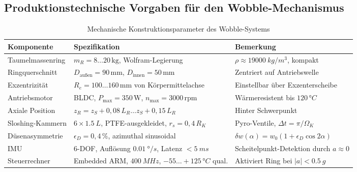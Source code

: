 ﻿\documentclass[12pt,a4paper]{article}
\begin{document}
\subsection{Produktionstechnische Vorgaben für den Wobble-Mechanismus}

\begin{table}
\centering
\caption{Mechanische Konstruktionsparameter des Wobble-Systems}
\label{tab:wobble_params}
\begin{tabular}{lll}
\toprule
\textbf{Komponente} & \textbf{Spezifikation} & \textbf{Bemerkung}\\
\midrule
Taumelmassenring  & $m_R = 8\ldots20\,\mathrm{kg}$, Wolfram-Legierung &
  $\rho \approx \SI{19000}{kg/m^3}$, kompakt\\
Ringquerschnitt   & $D_{\mathrm{außen}} = 90\,\mathrm{mm}$, $D_{\mathrm{innen}}=50\,\mathrm{mm}$ &
  Zentriert auf Antriebswelle\\
Exzentrizität     & $R_e = 100\ldots160\,\mathrm{mm}$ von Körpermittelachse &
  Einstellbar über Exzenterscheibe\\
Antriebsmotor     & BLDC, $P_{\mathrm{max}} = 350\,\mathrm{W}$, $n_{\max}=3000\,\mathrm{rpm}$ &
  Wärmeresistent bis $120\, °C$\\
Axiale Position   & $z_R = z_S + 0{,}08\,L_R\ldots z_S + 0{,}15\,L_R$ &
  Hinter Schwerpunkt\\
Sloshing-Kammern  & $6\times \SI{1.5}{L}$, PTFE-ausgekleidet, $r_s=0{,}4\,R_K$ &
  Pyro-Ventile, $\Delta t = \pi/\Omega_K$\\
Düsenasymmetrie   & $\epsilon_D = 0{,}4\,\%$, azimuthal sinusoidal &
  $\delta w(\alpha)=w_0(1+\epsilon_D\cos2\alpha)$\\
IMU               & 6-DOF, Auflösung $\SI{0.01}{\degree/s}$, Latenz $<\SI{5}{ms}$ &
  Scheitelpunkt-Detektion durch $a\approx0$\\
Steuerrechner     & Embedded ARM, $\SI{400}{MHz}$, $-55\ldots+125\, °C$ qual. &
  Aktiviert Ring bei $|a|<\SI{0.5}{g}$\\
\bottomrule
\end{tabular}
\end{table}
\end{document}
